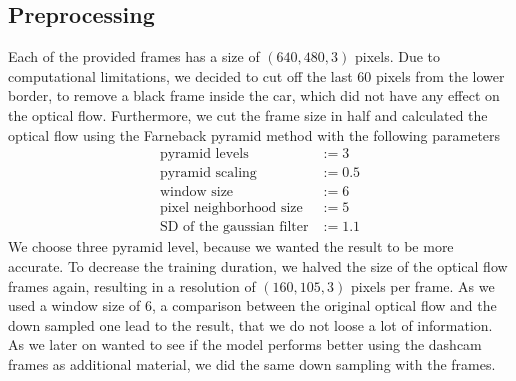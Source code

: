 \documentclass[conference]{IEEEtran}
\begin{document}
\subsection{Preprocessing}
Each of the provided frames has a size of $(640,480,3)$ pixels. Due to computational limitations, we decided to cut off the last 60 pixels from the lower border, to remove a black frame inside the car, which did not have any effect on the optical flow. Furthermore, we cut the frame size in half and calculated the optical flow using the Farneback pyramid \cite{Farneback2003} method with the following parameters
\begin{align*}
\text{pyramid levels} &:= 3\\
\text{pyramid scaling} &:= 0.5\\
\text{window size} &:= 6\\
\text{pixel neighborhood size} &:= 5\\
\text{SD of the gaussian filter} &:= 1.1
\end{align*}
We choose three pyramid level, because we wanted the result to be more accurate. To decrease the training duration, we halved the size of the optical flow frames again, resulting in a resolution of
$(160,105,3)$ pixels per frame. As we used a window size of $6$, a comparison between the original optical flow and the down 
sampled one lead to the result, that we do not loose a lot of information. As we later on wanted to see if the model performs better 
using the dashcam frames as additional material, we did the same down sampling with the frames.
\end{document}
